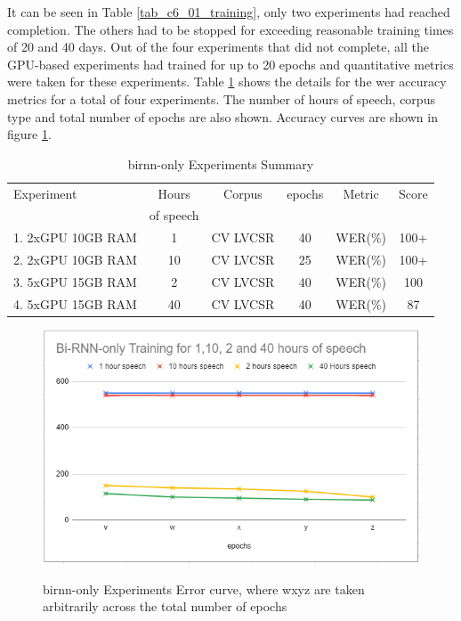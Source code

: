 {It can be seen in Table \ref{tab_c6_01_training}, only two experiments had reached completion.    The others had to be stopped for exceeding reasonable training times of 20 and 40 days. Out of the four experiments that did not complete, all the GPU-based experiments had trained for up to 20 epochs and quantitative metrics were taken for these experiments.  Table \ref{tab_c6_02_training} shows the details for the \acrfull{wer} accuracy metrics for a total of four experiments. The number of hours of speech, corpus type and total number of epochs are also shown. Accuracy curves are shown in figure \ref{fig_6_3_wer}.

\begin{table}
  \caption{\acrshort{birnn}-only Experiments Summary}
  \label{tab_c6_02_training}
\begin{tabular}{lccccc}
\toprule
Experiment & Hours & Corpus & epochs & Metric & Score\\& of speech\\
\midrule
1. 2xGPU 10GB RAM & 1 & CV LVCSR & 40 & WER(\%) & 100+\\
2. 2xGPU 10GB RAM & 10 & CV LVCSR & 25 & WER(\%) & 100+\\
3. 5xGPU 15GB RAM & 2 & CV LVCSR & 40 & WER(\%) & 100\\
4. 5xGPU 15GB RAM & 40 &  CV LVCSR & 40 & WER(\%) & 87\\
\bottomrule
\end{tabular}
\end{table}


\begin{figure}
\centering
  \includegraphics[width=14cm]{thesis/images/brnn_only.png}\\
  \caption{\acrshort{birnn}-only Experiments Error curve, where w\<x\<y\<z are taken arbitrarily across the total
number of epochs} \label{fig_6_3_wer}
\end{figure}


}
